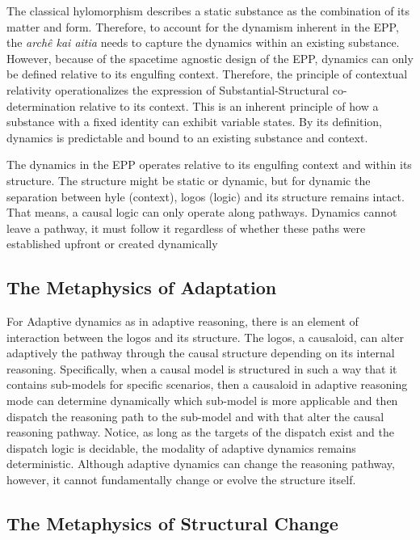 The classical hylomorphism describes a static substance as the combination of its matter and form. Therefore, to account for the dynamism inherent in the EPP, the \textit{archê kai aitia} needs to capture the dynamics within an existing substance. However, because of the spacetime agnostic design of the EPP, dynamics can only be defined relative to its engulfing context. Therefore, the principle of contextual relativity operationalizes the expression of Substantial-Structural co-determination relative to its context. This is an inherent  principle of how a substance with a fixed identity can exhibit variable states. By its definition, dynamics is predictable and bound to an existing substance and context. 

The dynamics in the EPP operates relative to its engulfing context and within its structure. The structure might be static or dynamic, but for dynamic the separation between hyle (context), logos (logic) and its structure remains intact. That means, a causal logic can only operate along pathways. Dynamics cannot leave a pathway, it must follow it regardless of whether these paths were established upfront or created dynamically

\subsection{The Metaphysics of Adaptation} 
\label{sec:metaphysics_adaptation}

 For Adaptive dynamics as in adaptive reasoning, there is an element of interaction between the logos and its structure. The logos, a causaloid, can alter adaptively the pathway through the causal structure depending on its internal reasoning. Specifically, when a causal model is structured in such a way that it contains sub-models for specific scenarios, then a causaloid in adaptive reasoning mode can determine dynamically which sub-model is more applicable and then dispatch the reasoning path to the sub-model and with that alter the causal reasoning pathway. Notice, as long as the targets of the dispatch exist and the dispatch logic is decidable, the modality of adaptive dynamics remains deterministic. Although adaptive dynamics can change the reasoning pathway, however, it cannot fundamentally change or evolve the structure itself.  


\subsection{The Metaphysics of Structural Change} 
\label{sec:metaphysics_becoming}

